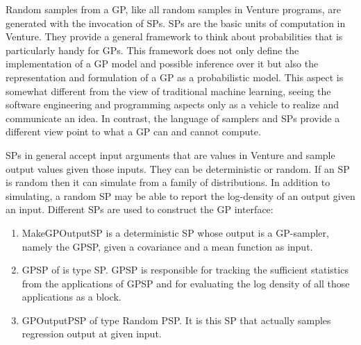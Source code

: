 % 
% 
% 
% 
% 
% 
Random samples from a \ac{GP}, like all random samples in Venture programs,
are generated with the invocation of \ac{SP}s. \ac{SP}s are the basic units of
computation in Venture. They provide a general framework to think about
probabilities that is particularly handy for \ac{GP}s. This framework does not
only define the implementation of a \ac{GP} model and possible inference over it but also
the representation and formulation of a \ac{GP} as a probabilistic model.
This aspect is somewhat different from the view of traditional machine learning,
seeing the software engineering and programming aspects only as a vehicle to
realize and communicate an idea.  In contrast, the language of samplers and \ac{SP}s provide a
different view point to what a \ac{GP} can and cannot compute.

\ac{SP}s in general accept input arguments that are values in Venture and sample output
values given those inputs. They can be deterministic or random. If an \ac{SP} is random
then it can simulate from a family of distributions. In addition to simulating,
a random \ac{SP} may be able to report the log-density of an output given an input.
Different \ac{SP}s are used to construct the \ac{GP} interface:
\begin{enumerate}
  \item MakeGPOutputSP is a deterministic \ac{SP} whose output is a
    \ac{GP}-sampler, namely the GPSP, given a covariance and a mean function as input. 
\item GPSP of is type SP\@. GPSP is responsible for tracking the sufficient statistics
from the applications of GPSP and for evaluating the log density of all those
applications as a block.
\item GPOutputPSP of type Random PSP\@.  It is this SP that actually samples
regression output at given input.
\end{enumerate}
